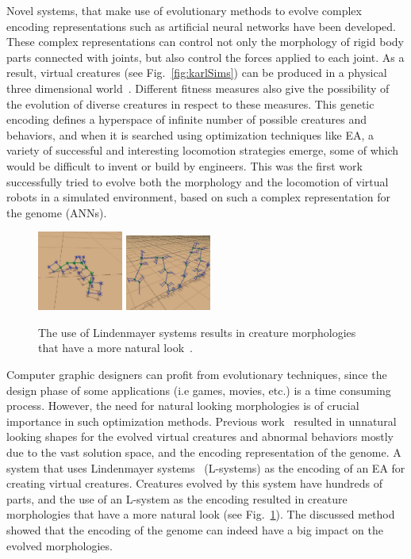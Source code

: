 Novel systems, that make use of evolutionary methods to evolve complex encoding representations such as artificial neural networks have been developed. These complex representations can control not only the morphology of rigid body parts connected with joints, but also control the forces applied to each joint. As a result, virtual creatures (see Fig.~\ref{fig:karlSims}) can be produced in a physical three dimensional world~\citep{sims1994evolving}. Different fitness measures also give the possibility of the evolution of diverse creatures in respect to these measures. This genetic encoding defines a hyperspace of infinite number of possible creatures and behaviors, and when it is searched using optimization techniques like EA, a variety of successful and interesting locomotion strategies emerge, some of which would be difficult to invent or build by engineers. This was the first work successfully tried to evolve both the morphology and the locomotion of virtual robots in a simulated environment, based on such a complex representation for the genome (ANNs).

\begin{figure}[t!]
\centering
\includegraphics[width=0.25\textwidth,height=0.2\textwidth]{../Figures/Misc/lsystems1.png}
\includegraphics[width=0.25\textwidth,height=0.2\textwidth]{../Figures/Misc/lsystems2.png}
\caption{The use of Lindenmayer systems results in creature morphologies that have a more natural look~\citep{hornby2001evolving}.}
\label{fig:lsystems}
\end{figure}

Computer graphic designers can profit from evolutionary techniques, since the design phase of some applications (i.e games, movies, etc.) is a time consuming process. However, the need for natural looking morphologies is of crucial importance in such optimization methods. Previous work~\citep{lipson2000automatic,sims1994evolving} resulted in unnatural looking shapes for the evolved virtual creatures and abnormal behaviors mostly due to the vast solution space, and the encoding representation of the genome. A system that uses Lindenmayer systems~\citep{hornby2001evolving} (L-systems) as the encoding of an EA for creating virtual creatures. Creatures evolved by this system have hundreds of parts, and the use of an L-system as the encoding resulted in creature morphologies that have a more natural look (see Fig.~\ref{fig:lsystems}). The discussed method~\citep{hornby2001evolving} showed that the encoding of the genome can indeed have a big impact on the evolved morphologies.

